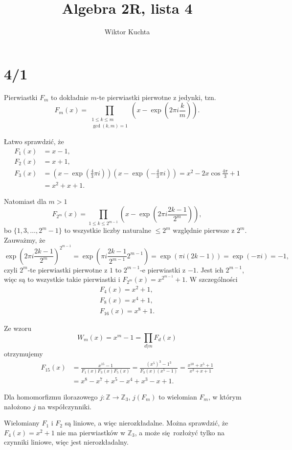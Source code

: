 \documentclass[a4paper, 12pt]{article}
\title{Algebra 2R, lista 4}
\author{Wiktor Kuchta}
\date{\vspace{-4ex}}
\newcommand{\+}{\enspace}
\begin{document}
\maketitle

\section*{4/1}
Pierwiastki $F_m$ to dokładnie $m$-te pierwiastki pierwotne z jedynki,
tzn.
$$F_m(x) = ∏_{\substack{1≤k≤m \\ \gcd(k,m)=1}} \left(x-\exp(2πi\frac{k}{m})\right).$$

Łatwo sprawdzić, że
\begin{align*}
	F_1(x) &= x-1, \\
	F_2(x) &= x+1, \\
	F_3(x) &= (x-\exp(\tfrac{4}{3}πi))(x-\exp(-\tfrac{4}{3}πi))
		= x^2 - 2x\cos \tfrac{4π}{3} + 1 \\
		&= x^2 + x + 1.
\end{align*}

Natomiast dla $m>1$
$$F_{2^m}(x) = ∏_{1≤k≤2^{m-1}} \left(x-\exp(2πi\frac{2k-1}{2^m})\right),$$
bo $\{1, 3, …, 2^m-1\}$ to wszystkie liczby naturalne $≤2^m$ względnie pierwsze z $2^m$.
Zauważmy, że
$$ \exp(2πi\frac{2k-1}{2^m})^{2^{m-1}} = \exp(πi\frac{2k-1}{2^{m-1}}2^{m-1})
= \exp(πi(2k-1)) = \exp(-πi) = -1,$$
czyli $2^m$-te pierwiastki pierwotne z $1$ to $2^{m-1}$-e pierwiastki z $-1$.
Jest ich $2^{m-1}$, więc są to wszystkie takie pierwiastki i $F_{2^m}(x) = x^{2^{m-1}}+1$.
W szczególności
\begin{align*}
	F_4(x) = x^2+1, \\
	F_8(x) = x^4+1, \\
	F_{16}(x) = x^8+1.
\end{align*}

Ze wzoru
$$W_m(x) = x^m-1 = ∏_{d|m} F_d(x)$$
otrzymujemy
\begin{align*}
F_{15}(x)
&= \frac{x^{15}-1}{F_1(x)F_3(x)F_5(x)}
= \frac{(x^{5})^3-1^3}{F_3(x)(x^5-1)}
= \frac{x^{10}+x^5+1}{x^2+x+1} \\
&= x^8-x^7+x^5-x^4+x^3-x+1.
\end{align*}

Dla homomorfizmu ilorazowego $j: ℤ → ℤ_3$,
$j(F_m)$ to wielomian $F_m$, w którym nałożono $j$ na współczynniki.

Wielomiany $F_1$ i $F_2$ są liniowe, a więc nierozkładalne.
Można sprawdzić, że $F_4(x) = x^2+1$ nie ma pierwiastków w $ℤ_3$, a
może się rozłożyć tylko na czynniki liniowe, więc jest nierozkładalny.
\end{document}
